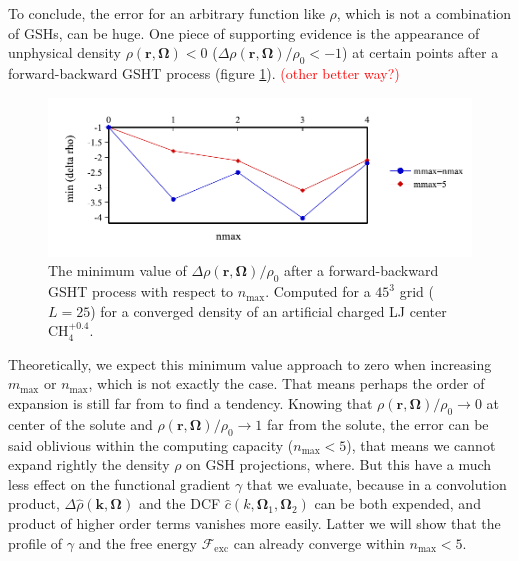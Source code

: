 To conclude, the error for an arbitrary function like $\rho$,
which is not a combination of \acs{GSH}s, can be huge. One piece of supporting evidence
is the appearance of unphysical density $\rho(\mathbf{r},\mathbf{\Omega})<0$
($\Delta\rho(\mathbf{r},\mathbf{\Omega})/\rho_{0}<-1$) at certain
points after a forward-backward \acs{GSHT} process (figure \ref{fig:unphysical-rho}).
\textcolor{red}{(other better way?)}

\begin{figure}[h]
\begin{centering}
\includegraphics[bb=0bp 10bp 454bp 160bp,width=0.75\columnwidth]{_figure/results/min_delta_rho}
\par\end{centering}
\caption[The minimum value of $\Delta\rho(\mathbf{r},\mathbf{\Omega})/\rho_{0}$
after a forward-backward \acs{GSHT} process]{The minimum value of $\Delta\rho(\mathbf{r},\mathbf{\Omega})/\rho_{0}$
after a forward-backward \acs{GSHT} process with respect to $n_{\max}$.
Computed for a $45^{3}$ grid ($L=25$) for a converged density of
an artificial charged LJ center $\mathrm{CH}_{4}^{+0.4}$. \label{fig:unphysical-rho} }
\end{figure}

Theoretically, we expect this minimum value approach to zero when
increasing $m_{\max}$ or $n_{\max}$, which is not exactly the case.
That means perhaps the order of expansion is still far from to find
a tendency. Knowing that $\rho(\mathbf{r},\mathbf{\Omega})/\rho_{0}\rightarrow0$
at center of the solute and $\rho(\mathbf{r},\mathbf{\Omega})/\rho_{0}\rightarrow1$
far from the solute, the error can be said oblivious within the computing
capacity ($n_{\max}<5$), that means we cannot expand rightly the
density $\rho$ on \acs{GSH} projections, where. But this have a
much less effect on the functional gradient $\gamma$ that we evaluate,
because in a convolution product, $\Delta\hat{\rho}(\mathbf{k},\mathbf{\Omega})$
and the \acs{DCF} $\hat{c}(k,\mathbf{\Omega}_{1},\mathbf{\Omega}_{2})$
can be both expended, and product of higher order terms vanishes more
easily. Latter we will show that the profile of $\gamma$ and the
free energy $\mathcal{F}_{\mathrm{exc}}$ can already converge within
$n_{\max}<5$.

